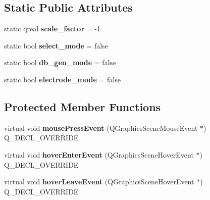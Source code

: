 \subsection*{Static Public Attributes}
\begin{DoxyCompactItemize}
\item 
static qreal {\bfseries scale\+\_\+factor} = -\/1\hypertarget{classprim_1_1Item_ad933d2f7bd50855e185b5b40892bf443}{}\label{classprim_1_1Item_ad933d2f7bd50855e185b5b40892bf443}

\item 
static bool {\bfseries select\+\_\+mode} = false\hypertarget{classprim_1_1Item_a5fa9c62bd2ec8f1817b29c42e351c6a3}{}\label{classprim_1_1Item_a5fa9c62bd2ec8f1817b29c42e351c6a3}

\item 
static bool {\bfseries db\+\_\+gen\+\_\+mode} = false\hypertarget{classprim_1_1Item_a0bfa8382e489fe7a34da66b1a61ba8a4}{}\label{classprim_1_1Item_a0bfa8382e489fe7a34da66b1a61ba8a4}

\item 
static bool {\bfseries electrode\+\_\+mode} = false\hypertarget{classprim_1_1Item_ad75df406c06999ff2fe13696a45d5677}{}\label{classprim_1_1Item_ad75df406c06999ff2fe13696a45d5677}

\end{DoxyCompactItemize}
\subsection*{Protected Member Functions}
\begin{DoxyCompactItemize}
\item 
virtual void {\bfseries mouse\+Press\+Event} (Q\+Graphics\+Scene\+Mouse\+Event $\ast$) Q\+\_\+\+D\+E\+C\+L\+\_\+\+O\+V\+E\+R\+R\+I\+DE\hypertarget{classprim_1_1Item_a75a1a4b6f81ebd0fd0645a6c5edb254c}{}\label{classprim_1_1Item_a75a1a4b6f81ebd0fd0645a6c5edb254c}

\item 
virtual void {\bfseries hover\+Enter\+Event} (Q\+Graphics\+Scene\+Hover\+Event $\ast$) Q\+\_\+\+D\+E\+C\+L\+\_\+\+O\+V\+E\+R\+R\+I\+DE\hypertarget{classprim_1_1Item_a525884955272aa10a485b5e98b21ff9f}{}\label{classprim_1_1Item_a525884955272aa10a485b5e98b21ff9f}

\item 
virtual void {\bfseries hover\+Leave\+Event} (Q\+Graphics\+Scene\+Hover\+Event $\ast$) Q\+\_\+\+D\+E\+C\+L\+\_\+\+O\+V\+E\+R\+R\+I\+DE\hypertarget{classprim_1_1Item_aeb2f8ca4597c824cb58c3ae7092624ed}{}\label{classprim_1_1Item_aeb2f8ca4597c824cb58c3ae7092624ed}

\end{DoxyCompactItemize}
